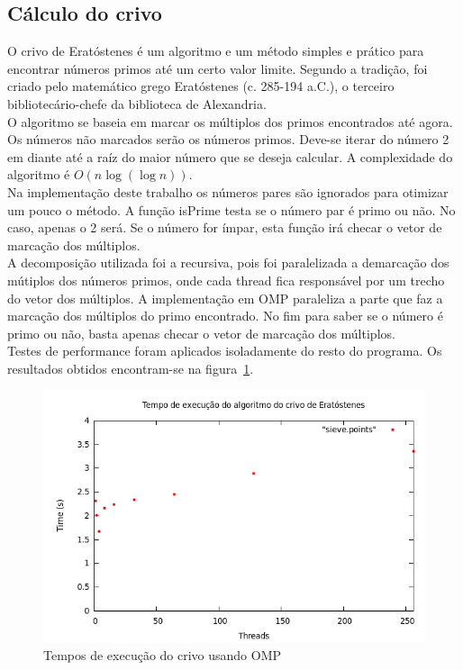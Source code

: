 \documentclass[a4paper]{article}
\begin{document}
\subsection{Cálculo do crivo}
\indent \indent O crivo de Eratóstenes é um algoritmo e um método simples e prático para encontrar números primos até um certo valor limite. Segundo a tradição, foi criado pelo matemático grego Eratóstenes (c. 285-194 a.C.), o terceiro bibliotecário-chefe da biblioteca de Alexandria.\\
\indent O algoritmo se baseia em marcar os múltiplos dos primos encontrados até agora. Os números não marcados serão os números primos. Deve-se iterar do número 2 em diante até a raíz do maior número que se deseja calcular. A complexidade do algoritmo é \begin{math}O(n\log(\log n))\end{math}.\\
\indent Na implementação deste trabalho os números pares são ignorados para otimizar um pouco o método. A função isPrime testa se o número par é primo ou não. No caso, apenas o 2 será. Se o número for ímpar, esta função irá checar o vetor de marcação dos múltiplos.\\
\indent A decomposição utilizada foi a recursiva, pois foi paralelizada a demarcação dos mútiplos dos números primos, onde cada thread fica responsável por um trecho do vetor dos múltiplos. A implementação em OMP paraleliza a parte que faz a marcação dos múltiplos do primo encontrado. No fim para saber se o número é primo ou não, basta apenas checar o vetor de marcação dos múltiplos.\\
\indent Testes de performance foram aplicados isoladamente do resto do programa. Os resultados obtidos encontram-se na figura~\ref{graph-sieve-omp}.
\begin{figure}
	\includegraphics[scale=0.5]{graph-sieve-omp}
	\caption{Tempos de execução do crivo usando OMP}
	\label{graph-sieve-omp}
\end{figure}
\end{document}
